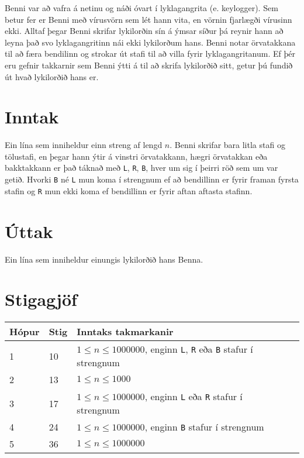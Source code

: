 Benni var að vafra á netinu og náði óvart í lyklagangrita (e. keylogger). Sem betur fer er Benni með vírusvörn sem lét hann vita, en vörnin fjarlægði vírusinn ekki. Alltaf þegar Benni skrifar lykilorðin sín á ýmsar síður þá reynir hann að leyna það svo lyklagangritinn nái ekki lykilorðum hans. Benni notar örvatakkana til að færa bendilinn og strokar út stafi til að villa fyrir lyklagangritanum. Ef þér eru gefnir takkarnir sem Benni ýtti á til að skrifa lykilorðið sitt, getur þú fundið út hvað lykilorðið hans er.

\section*{Inntak}
Ein lína sem inniheldur einn streng af lengd $n$. Benni skrifar bara litla stafi og tölustafi, en þegar hann ýtir á vinstri örvatakkann, hægri örvatakkan eða bakktakkann er það táknað með \texttt{L}, \texttt{R}, \texttt{B}, hver um sig í þeirri röð sem um var getið. Hvorki \texttt{B} né \texttt{L} mun koma í strengnum ef að bendillinn er fyrir framan fyrsta stafin og \texttt{R} mun ekki koma ef bendillinn er fyrir aftan aftasta stafinn.

\section*{Úttak}
Ein lína sem inniheldur einungis lykilorðið hans Benna.

\section*{Stigagjöf}
\begin{tabular}{|l|l|l|l|}
\hline
Hópur & Stig & Inntaks takmarkanir \\ \hline
    1 &   10 & $1 \leq n \leq 1000000$, enginn \texttt{L}, \texttt{R} eða \texttt{B} stafur í strengnum \\ \hline
    2 &   13 & $1 \leq n \leq 1000$ \\ \hline
    3 &   17 & $1 \leq n \leq 1000000$, enginn \texttt{L} eða \texttt{R} stafur í strengnum \\ \hline
    4 &   24 & $1 \leq n \leq 1000000$, enginn \texttt{B} stafur í strengnum \\ \hline
    5 &   36 & $1 \leq n \leq 1000000$ \\ \hline
\end{tabular}
